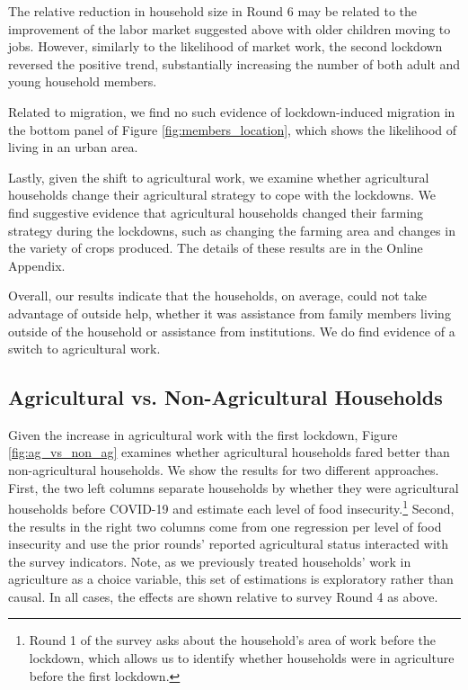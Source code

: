 \documentclass{wber}
\begin{document}
The relative reduction in household size in Round 6 may be related to
the improvement of the labor market suggested above with older children
moving to jobs. However, similarly to the likelihood of market work, the
second lockdown reversed the positive trend, substantially increasing
the number of both adult and young household members.

Related to migration, we find no such evidence of lockdown-induced
migration in the bottom panel of Figure \ref{fig:members_location}, which
shows the likelihood of living in an urban area.

Lastly, given the shift to agricultural work, we examine whether
agricultural households change their agricultural strategy to cope with
the lockdowns. We find suggestive evidence that agricultural households
changed their farming strategy during the lockdowns, such as changing
the farming area and changes in the variety of crops produced. 
The details of these results are in the Online Appendix.

Overall, our results indicate that the households, on average, could not
take advantage of outside help, whether it was assistance from family
members living outside of the household or assistance from institutions.
We do find evidence of a switch to agricultural work.

\subsection{Agricultural vs. Non-Agricultural Households}\label{agricultural-vs.-non-agricultural-households}

Given the increase in agricultural work with the first lockdown,
Figure \ref{fig:ag_vs_non_ag} examines whether agricultural households
fared better than non-agricultural households. We show the results for
two different approaches. First, the two left columns separate
households by whether they were agricultural households before COVID-19
and estimate each level of food insecurity.\footnote{Round 1 of the
  survey asks about the household's area of work before the lockdown,
  which allows us to identify whether households were in agriculture
  before the first lockdown.} Second, the results in the right two
columns come from one regression per level of food insecurity and use
the prior rounds' reported agricultural status interacted with the
survey indicators. Note, as we previously treated households' work in
agriculture as a choice variable, this set of estimations is exploratory
rather than causal. In all cases, the effects are shown relative to
survey Round 4 as above.
\end{document}
